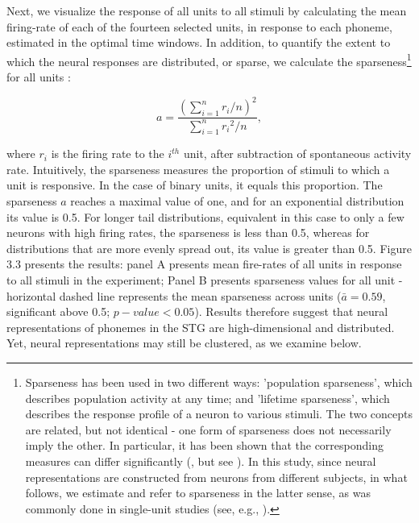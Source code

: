 Next, we visualize the response of all units to all stimuli by calculating the mean firing-rate of each of the fourteen selected units, in response to each phoneme, estimated in the optimal time windows. In addition, to quantify the extent to which the neural responses are distributed, or sparse, we calculate the sparseness\footnote{Sparseness has been used in two different ways: 'population sparseness', which describes population activity at any time; and 'lifetime sparseness', which describes the response profile of a neuron to various stimuli. The two concepts are related, but not identical - one form of sparseness does not necessarily imply the other. In particular, it has been shown that the corresponding measures can differ significantly (\citealp{willmore2001characterizing}, but see \citealp{weliky2003coding}). In this study, since neural representations are constructed from neurons from different subjects, in what follows, we estimate and refer to sparseness in the latter sense, as was commonly done in single-unit studies (see, e.g., \citealp{rolls1995sparseness, vinje2000sparse}).} for all units \citep{treves1991determines, olshausen2004sparse}:

\begin{equation}
    a = \frac{(\sum_{i=1}^n{r_i/n})^2}{\sum_{i=1}^n{{r_i}^2/n}},
\end{equation}

where $r_i$ is the firing rate to the $i^{th}$ unit, after subtraction of spontaneous activity rate. Intuitively, the sparseness measures the proportion of stimuli to which a unit is responsive. In the case of binary units, it equals this proportion. The sparseness $a$ reaches a maximal value of one, and for an exponential distribution its value is 0.5. For longer tail distributions, equivalent in this case to only a few neurons with high firing rates, the sparseness is less than 0.5, whereas for distributions that are more evenly spread out, its value is greater than 0.5. Figure 3.3 presents the results: panel A presents mean fire-rates of all units in response to all stimuli in the experiment; Panel B presents sparseness values for all unit - horizontal dashed line represents the mean sparseness across units ($\bar{a}=0.59$, significant above 0.5; $p-value < 0.05$). Results therefore suggest that neural representations of phonemes in the STG are high-dimensional and distributed. Yet, neural representations may still be clustered, as we examine below.

